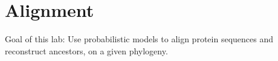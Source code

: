 \chapter{Alignment}

Goal of this lab:
Use probabilistic models to align protein sequences and reconstruct ancestors, on a given phylogeny.

